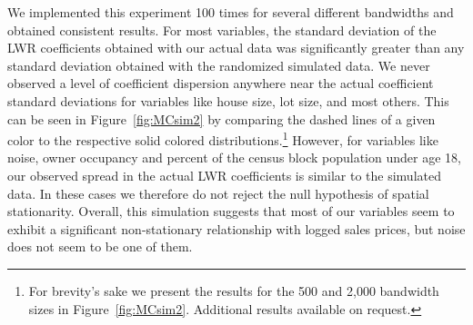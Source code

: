 \documentclass[leqno]{article}\usepackage[]{graphicx}\usepackage[]{color}
\begin{document}
We implemented this experiment 100 times for several different bandwidths and obtained consistent results. For most variables, the standard deviation of the LWR coefficients obtained with our actual data was significantly greater than any standard deviation obtained with the randomized simulated data. We never observed a level of coefficient dispersion anywhere near the actual coefficient standard deviations for variables like house size, lot size, and most others. This can be seen in Figure~\ref{fig:MCsim2} by comparing the dashed lines of a given color to the respective solid colored distributions.\footnote{For brevity's sake we present the results for the 500 and 2,000 bandwidth sizes in Figure~\ref{fig:MCsim2}. Additional results available on request.} However, for variables like noise, owner occupancy and percent of the census block population under age 18, our observed spread in the actual LWR coefficients is similar to the simulated data. In these cases we therefore do not reject the null hypothesis of spatial stationarity. Overall, this simulation suggests that most of our variables seem to exhibit a significant non-stationary relationship with logged sales prices, but noise does not seem to be one of them.
\end{document}
